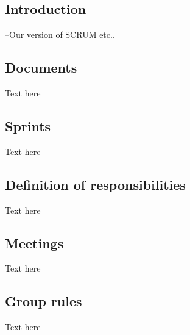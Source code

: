 
\subsection{Introduction}
--Our version of SCRUM etc..

\subsection{Documents}
Text here

\subsection{Sprints}
Text here

\subsection{Definition of responsibilities}
Text here

\subsection{Meetings}
Text here

\subsection{Group rules}
Text here